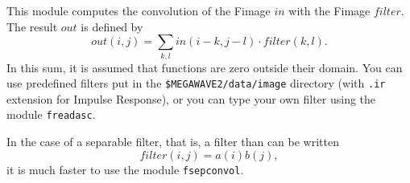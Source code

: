 This module computes the convolution 
 of the Fimage $in$ with the Fimage
$filter$. The result $out$ is defined by
$$out(i,j) = \sum_{k,l} in(i-k,j-l) \cdot filter(k,l).$$
In this sum, it is assumed that functions are zero outside their
domain.
You can use predefined filters put in the \verb+$MEGAWAVE2/data/image+ 
directory (with \verb+.ir+ extension for Impulse Response), 
or you can type your own filter using the module \verb+freadasc+.

\smallskip

In the case of a separable filter, that is, a filter than can be
written
$$filter(i,j)=a(i)b(j),$$
it is much faster to use the module \verb+fsepconvol+.


